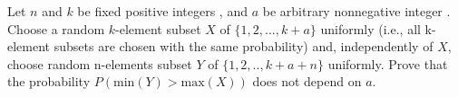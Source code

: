 Let $n$ and $k$ be fixed positive integers , and $a$ be arbitrary nonnegative integer .
Choose a random $k$-element subset $X$ of $\{1,2,...,k+a\}$ uniformly (i.e., all k-element subsets are chosen with the same probability) and, independently of $X$, choose  random n-elements subset $Y$ of $\{1,2,..,k+a+n\}$ uniformly.
Prove that the probability
$P\left( \text{min}(Y)>\text{max}(X)\right)$
does not depend on $a$.